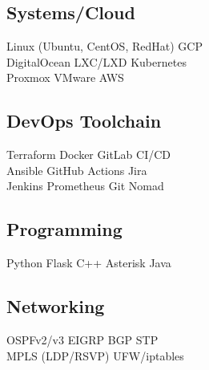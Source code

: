\documentclass[letterpaper]{deedy-resume} %
\begin{document}
\begin{minipage}[t]{0.33\textwidth}
\subsection{Systems/Cloud}

Linux (Ubuntu, CentOS, RedHat) \textbullet{} GCP \\
DigitalOcean \textbullet{} LXC/LXD \textbullet{} Kubernetes\\
Proxmox \textbullet{} VMware \textbullet{} AWS\\

\sectionspace %
\sectionspace %

\subsection{DevOps Toolchain}
Terraform \textbullet{} Docker \textbullet{} GitLab CI/CD\\
Ansible \textbullet{} GitHub Actions \textbullet{} Jira\\ 
Jenkins \textbullet{} Prometheus \textbullet{} Git \textbullet{} Nomad\\

\sectionspace %
\sectionspace %

\subsection{Programming}

Python \textbullet{} Flask \textbullet{} C++ \textbullet{} Asterisk \textbullet{}  Java \\ 
 
\sectionspace %
\sectionspace %

\subsection{Networking}

OSPFv2/v3 \textbullet{} EIGRP \textbullet{} BGP \textbullet{} STP \\ 
MPLS (LDP/RSVP) \textbullet{} UFW/iptables

\sectionspace %
\sectionspace %


\end{minipage}
\end{document}
